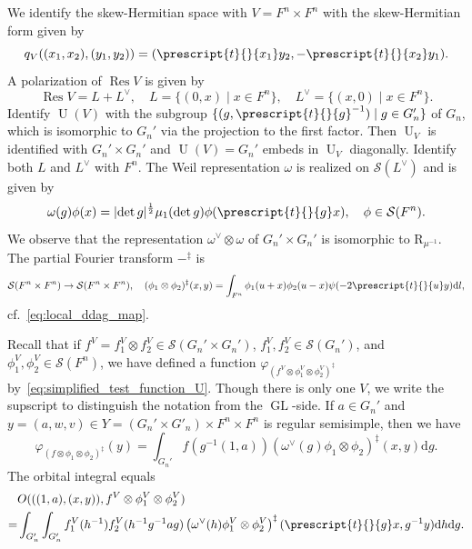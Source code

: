 \documentclass[letterpaper,11pt]{amsart}
\newcommand{\cS}{\mathcal{S}}
\newcommand{\rd}{\mathrm{d}}
\newcommand{\<}{\negthickspace}
\newcommand{\tp}[1]{\prescript{t}{}{#1}}
\providecommand{\abs}[1]{\lvert#1\rvert}
\DeclareMathOperator{\GL}{GL}
\DeclareMathOperator{\U}{U}
\DeclareMathOperator{\Res}{Res}
\theoremstyle{definition}
\theoremstyle{plain}
\theoremstyle{remark}
\numberwithin{equation}{section}
\begin{document}
We identify the skew-Hermitian space with $V = F^n \times F^n$ with the
skew-Hermitian form given by
    \[
    q_{V}((x_1, x_2), (y_1, y_2)) =
    (\tp{x_1} y_2,  - \tp{x_2} y_1).
    \]
A polarization of $\Res V$ is given by
    \[
    \Res V = L + L^\vee, \quad L = \{(0, x) \mid x \in F^n\}, \quad
    L^\vee = \{(x, 0) \mid x \in F^n\}.
    \]
Identify $\U(V)$ with the subgroup $\{(g, \tp{g}^{-1}) \mid g\in G_n'\}$ of
$G_n$, which is isomorphic to $G_n'$ via the projection to the first factor.
Then $\U_V$ is identified with $G_n' \times G_n'$ and $\U(V) = G_n'$ embeds
in $\U_V$ diagonally. Identify both $L$ and $L^\vee$ with $F^{n}$. The Weil
representation $\omega$ is realized on $\cS(L^\vee)$ and is given by
    \[
    \omega(g) \phi(x) = \abs{\det g}^{\frac{1}{2}} \mu_1(\det g) \phi(\tp{g}x),
    \quad
    \phi \in \cS(F^{n}).
    \]
We observe that the representation $\omega^\vee \otimes \omega$ of $G_n'
\times G_n'$ is isomorphic to $\mathrm{R}_{\mu^{-1}}$. The partial Fourier transform
$-^\ddag$ is
    \[
    \cS(F^{n} \times F^{n}) \to \cS(F^{n} \times F^{n}), \quad
    (\phi_1 \otimes \phi_2)^\ddag(x, y) = \int_{F^{n}} \phi_1(u+x)
    \phi_2(u-x) \psi(-  2 \tp{u} y) \rd l,
    \]
cf.~\eqref{eq:local_ddag_map}.


Recall that if $f^V = f_1^V \otimes f_2^V \in
\cS(G_n' \times G_n')$, $f_1^V, f_2^V \in \cS(G_n')$, and $\phi_1^V, \phi_2^V
\in \cS(F^{n})$, we have defined a function $\varphi_{(f^V \otimes \phi_1^V
\otimes \phi_2^V)^\ddag}$ by~\eqref{eq:simplified_test_function_U}. Though
there is only one $V$, we write the supscript to distinguish the notation
from the $\GL$-side.  If $a \in G_n'$ and $y = (a, w, v) \in Y = (G_n' \times
G'_n) \times F^{n} \times F^n$ is regular semisimple, then we have
    \begin{equation}
    \varphi_{(f \otimes \phi_1 \otimes \phi_2)^\ddag}(y) =
    \int_{G_n'}
    f(g^{-1}(1, a))
    (\omega^\vee(g)\phi_1 \otimes \phi_2)^\ddag(x, y)
    \rd g.
    \end{equation}
The orbital integral equals
    \begin{equation}    \label{eq:oi_u_split}
    \begin{aligned}
    &O(((1, a), (x, y)), f^V \otimes \phi_1^V \otimes \phi_2^V)\\ =
    & \int_{G_n'} \int_{G_n'}
    f_1^V(h^{-1}) f_2^V(h^{-1} g^{-1} a g)
    \left( \omega^\vee(h) \phi_1^V \otimes \phi_2^V \right)^\ddag
    (\tp{g}x, g^{-1}y)
    \rd h \rd g.
    \end{aligned}
    \end{equation}
\end{document}
